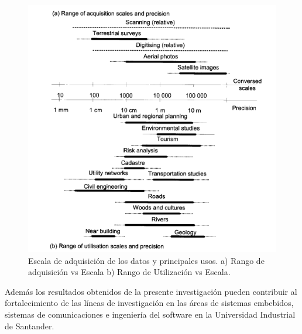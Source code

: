 \begin{figure}[htbp]
	\centering
	\includegraphics[scale=0.58]{Imagenes/Apps.png}
	\caption{Escala de adquisición de los datos y principales usos. a) Rango de adquisición vs Escala b) Rango de Utilización vs Escala. \cite{laurini2002information}} 
	\label{fig:Apps}
\end{figure}


Además los resultados obtenidos de la presente investigación pueden contribuir al fortalecimiento de las líneas de investigación en las áreas de sistemas embebidos, sistemas de comunicaciones e ingeniería del software en la Universidad Industrial de Santander. \\



